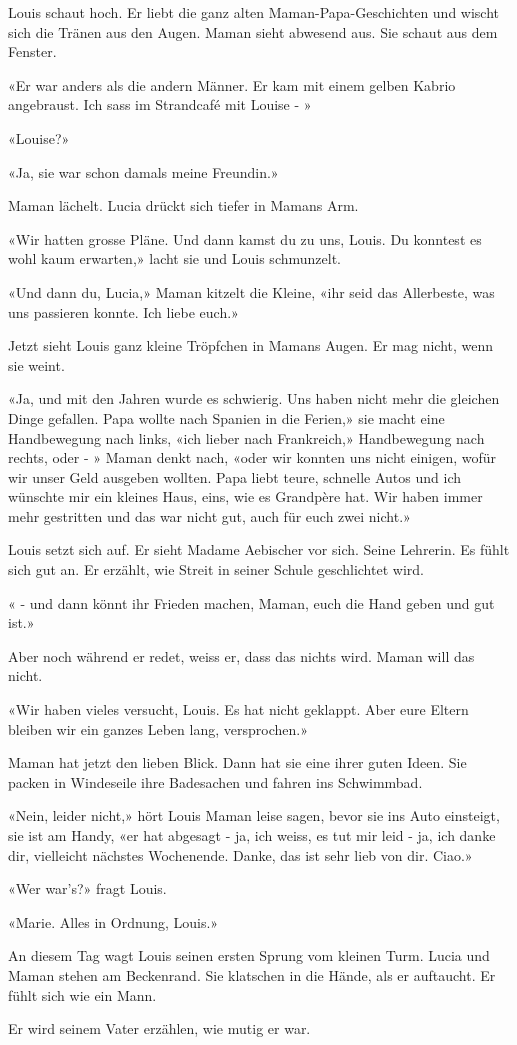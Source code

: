 {Louis schaut hoch. Er liebt die ganz alten Maman-Papa-Geschichten und
wischt sich die Tränen aus den Augen. Maman sieht abwesend aus. Sie
schaut aus dem Fenster.

«Er war anders als die andern Männer. Er kam mit einem gelben Kabrio
angebraust. Ich sass im Strandcafé mit Louise - »

«Louise?»

«Ja, sie war schon damals meine Freundin.»

Maman lächelt. Lucia drückt sich tiefer in Mamans Arm.

«Wir hatten grosse Pläne. Und dann kamst du zu uns, Louis. Du konntest
es wohl kaum erwarten,» lacht sie und Louis schmunzelt.

«Und dann du, Lucia,» Maman kitzelt die Kleine, «ihr seid das
Allerbeste, was uns passieren konnte. Ich liebe euch.»

Jetzt sieht Louis ganz kleine Tröpfchen in Mamans Augen. Er mag nicht,
wenn sie weint.

«Ja, und mit den Jahren wurde es schwierig. Uns haben nicht mehr die
gleichen Dinge gefallen. Papa wollte nach Spanien in die Ferien,» sie
macht eine Handbewegung nach links, «ich lieber nach Frankreich,»
Handbewegung nach rechts, oder - » Maman denkt nach, «oder wir konnten
uns nicht einigen, wofür wir unser Geld ausgeben wollten. Papa liebt
teure, schnelle Autos und ich wünschte mir ein kleines Haus, eins, wie
es Grandpère hat. Wir haben immer mehr gestritten und das war nicht gut,
auch für euch zwei nicht.»

Louis setzt sich auf. Er sieht Madame Aebischer vor sich. Seine
Lehrerin. Es fühlt sich gut an. Er erzählt, wie Streit in seiner Schule
geschlichtet wird.

« - und dann könnt ihr Frieden machen, Maman, euch die Hand geben und
gut ist.»

Aber noch während er redet, weiss er, dass das nichts wird. Maman will
das nicht.

«Wir haben vieles versucht, Louis. Es hat nicht geklappt. Aber eure
Eltern bleiben wir ein ganzes Leben lang, versprochen.»

Maman hat jetzt den lieben Blick. Dann hat sie eine ihrer guten
Ideen. Sie packen in Windeseile ihre Badesachen und fahren ins
Schwimmbad.

«Nein, leider nicht,» hört Louis Maman leise sagen, bevor sie ins Auto
einsteigt, sie ist am Handy, «er hat abgesagt - ja, ich weiss, es tut
mir leid - ja, ich danke dir, vielleicht nächstes Wochenende. Danke, das
ist sehr lieb von dir. Ciao.»

«Wer war’s?» fragt Louis.

«Marie. Alles in Ordnung, Louis.»

An diesem Tag wagt Louis seinen ersten Sprung vom kleinen Turm. Lucia
und Maman stehen am Beckenrand. Sie klatschen in die Hände, als er
auftaucht. Er fühlt sich wie ein Mann.

Er wird seinem Vater erzählen, wie mutig er war.}
